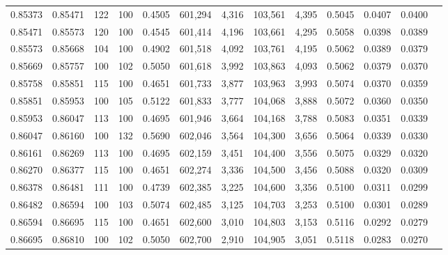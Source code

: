 \begin{tabular}{rrrrrrrrrrrrr}
0.85373 & 0.85471 &   122 & 100 &                                     0.4505 & 601,294 &   4,316 & 103,561 &   4,395 & 0.5045 & 0.0407 & 0.0400 \\
0.85471 & 0.85573 &   120 & 100 &                                     0.4545 & 601,414 &   4,196 & 103,661 &   4,295 & 0.5058 & 0.0398 & 0.0389 \\
0.85573 & 0.85668 &   104 & 100 &                                     0.4902 & 601,518 &   4,092 & 103,761 &   4,195 & 0.5062 & 0.0389 & 0.0379 \\
0.85669 & 0.85757 &   100 & 102 &                                     0.5050 & 601,618 &   3,992 & 103,863 &   4,093 & 0.5062 & 0.0379 & 0.0370 \\
0.85758 & 0.85851 &   115 & 100 &                                     0.4651 & 601,733 &   3,877 & 103,963 &   3,993 & 0.5074 & 0.0370 & 0.0359 \\
0.85851 & 0.85953 &   100 & 105 &                                     0.5122 & 601,833 &   3,777 & 104,068 &   3,888 & 0.5072 & 0.0360 & 0.0350 \\
0.85953 & 0.86047 &   113 & 100 &                                     0.4695 & 601,946 &   3,664 & 104,168 &   3,788 & 0.5083 & 0.0351 & 0.0339 \\
0.86047 & 0.86160 &   100 & 132 &                                     0.5690 & 602,046 &   3,564 & 104,300 &   3,656 & 0.5064 & 0.0339 & 0.0330 \\
0.86161 & 0.86269 &   113 & 100 &                                     0.4695 & 602,159 &   3,451 & 104,400 &   3,556 & 0.5075 & 0.0329 & 0.0320 \\
0.86270 & 0.86377 &   115 & 100 &                                     0.4651 & 602,274 &   3,336 & 104,500 &   3,456 & 0.5088 & 0.0320 & 0.0309 \\
0.86378 & 0.86481 &   111 & 100 &                                     0.4739 & 602,385 &   3,225 & 104,600 &   3,356 & 0.5100 & 0.0311 & 0.0299 \\
0.86482 & 0.86594 &   100 & 103 &                                     0.5074 & 602,485 &   3,125 & 104,703 &   3,253 & 0.5100 & 0.0301 & 0.0289 \\
0.86594 & 0.86695 &   115 & 100 &                                     0.4651 & 602,600 &   3,010 & 104,803 &   3,153 & 0.5116 & 0.0292 & 0.0279 \\
0.86695 & 0.86810 &   100 & 102 &                                     0.5050 & 602,700 &   2,910 & 104,905 &   3,051 & 0.5118 & 0.0283 & 0.0270 \\

\end{tabular}
